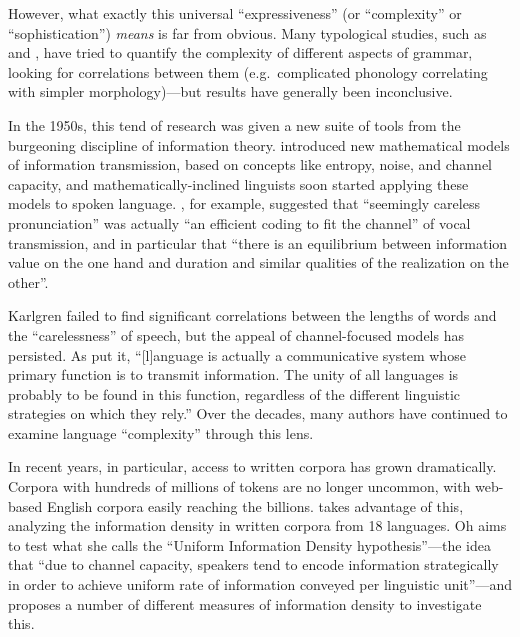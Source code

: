 \documentclass[12pt,twoside]{article}
\begin{document}

However, what exactly this universal ``expressiveness'' (or ``complexity'' or ``sophistication'') \emph{means} is far from obvious. Many typological studies, such as \citet{maddieson} and \citet{shosted}, have tried to quantify the complexity of different aspects of grammar, looking for correlations between them (e.g.\ complicated phonology correlating with simpler morphology)---but results have generally been inconclusive.

In the 1950s, this tend of research was given a new suite of tools from the burgeoning discipline of information theory. \citet{shannon} introduced new mathematical models of information transmission, based on concepts like entropy, noise, and channel capacity, and mathematically-inclined linguists soon started applying these models to spoken language. \citet[674,676]{karlgren}, for example, suggested that ``seemingly careless pronunciation'' was actually ``an efficient coding to fit the channel'' of vocal transmission, and in particular that ``there is an equilibrium between information value on the one hand and duration and similar qualities of the realization on the other''.

Karlgren failed to find significant correlations between the lengths of words and the ``carelessness'' of speech, but the appeal of channel-focused models has persisted. As \citet[539]{pellegrino} put it, ``[l]anguage is actually a communicative system whose primary function is to transmit information. The unity of all languages is probably to be found in this function, regardless of the different linguistic strategies on which they rely.'' Over the decades, many authors have continued to examine language ``complexity'' through this lens.

In recent years, in particular, access to written corpora has grown dramatically. Corpora with hundreds of millions of tokens are no longer uncommon, with web-based English corpora easily reaching the billions. \citet{oh} takes advantage of this, analyzing the information density in written corpora from 18 languages. Oh aims to test what she calls the ``Uniform Information Density hypothesis''---the idea that ``due to channel capacity, speakers tend to encode information strategically in order to achieve uniform rate of information conveyed per linguistic unit''---and proposes a number of different measures of information density to investigate this.
\end{document}
